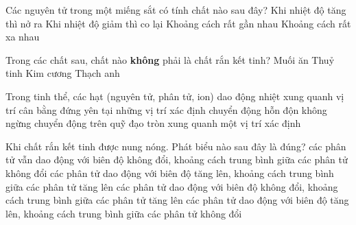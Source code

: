\begin{ex}%
	Các nguyên tử trong một miếng sắt có tính chất nào sau đây?
	\choice
	{Khi nhiệt độ tăng thì nở ra}
	{Khi nhiệt độ giảm thì co lại}
	{\True Khoảng cách rất gần nhau}
	{Khoảng cách rất xa nhau}
	\end{ex}



\begin{ex}%
	Trong các chất sau, chất nào \textbf{không} phải là chất rắn kết tinh?
	\choice
	{Muối ăn}
	{\True Thuỷ tinh}
	{Kim cương}
	{Thạch anh}
	\end{ex}









\begin{ex}%
	Trong tinh thể, các hạt (nguyên tử, phân tử, ion)
	\choice
	{\True dao động nhiệt xung quanh vị trí cân bằng}
	{đứng yên tại những vị trí xác định}
	{chuyển động hỗn độn không ngừng}
	{chuyển động trên quỹ đạo tròn xung quanh một vị trí xác định}
\end{ex}





\begin{ex}%
	Khi chất rắn kết tinh được nung nóng. Phát biểu nào sau đây là đúng?
	\choice
	{các phân tử vẫn dao động với biên độ không đổi, khoảng cách trung bình giữa các phân tử không đổi}
	{\True các phân tử dao động với biên độ tăng lên, khoảng cách trung bình giữa các phân tử tăng lên}
	{các phân tử dao động với biên độ không đổi, khoảng cách trung bình giữa các phân tử tăng lên}
	{các phân tử dao động với biên độ tăng lên, khoảng cách trung bình giữa các phân tử không đổi}
\end{ex}


